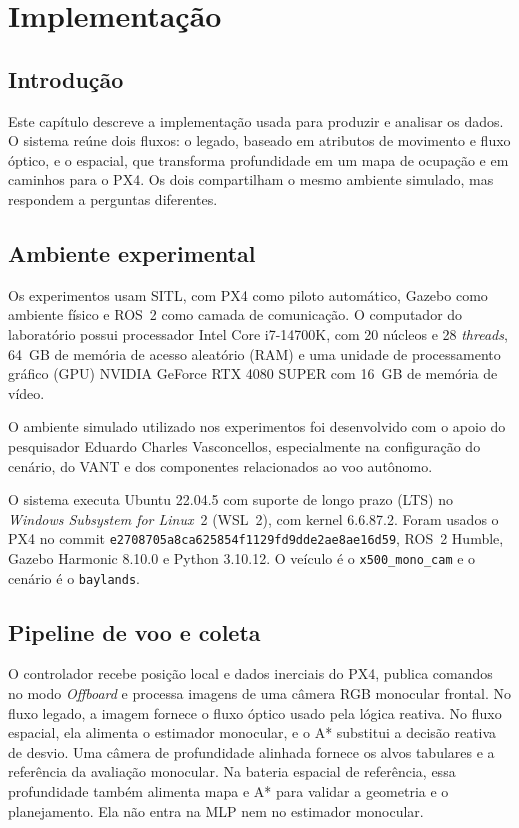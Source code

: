 \chapter{Implementação}\label{cap:implementacao}

\section{Introdução}

Este capítulo descreve a implementação usada para produzir e analisar os dados. O sistema reúne dois fluxos: o legado, baseado em atributos de movimento e fluxo óptico, e o espacial, que transforma profundidade em um mapa de ocupação e em caminhos para o PX4. Os dois compartilham o mesmo ambiente simulado, mas respondem a perguntas diferentes.

\section{Ambiente experimental}

Os experimentos usam SITL, com PX4 como piloto automático, Gazebo como ambiente físico e ROS~2 como camada de comunicação. O computador do laboratório possui processador Intel Core i7-14700K, com 20 núcleos e 28 \textit{threads}, 64~GB de memória de acesso aleatório (RAM) e uma unidade de processamento gráfico (GPU) NVIDIA GeForce RTX 4080 SUPER com 16~GB de memória de vídeo.

O ambiente simulado utilizado nos experimentos foi desenvolvido com o apoio do pesquisador Eduardo Charles Vasconcellos, especialmente na configuração do cenário, do VANT e dos componentes relacionados ao voo autônomo.

O sistema executa Ubuntu 22.04.5 com suporte de longo prazo (LTS) no \textit{Windows Subsystem for Linux}~2 (WSL~2), com kernel 6.6.87.2. Foram usados o PX4 no commit \texttt{e2708705a8ca625854f1129fd9dde2ae8ae16d59}, ROS~2 Humble, Gazebo Harmonic 8.10.0 e Python 3.10.12. O veículo é o \texttt{x500\_mono\_cam} e o cenário é o \texttt{baylands}.

\section{Pipeline de voo e coleta}

O controlador recebe posição local e dados inerciais do PX4, publica comandos no modo \textit{Offboard} e processa imagens de uma câmera RGB monocular frontal. No fluxo legado, a imagem fornece o fluxo óptico usado pela lógica reativa. No fluxo espacial, ela alimenta o estimador monocular, e o A* substitui a decisão reativa de desvio. Uma câmera de profundidade alinhada fornece os alvos tabulares e a referência da avaliação monocular. Na bateria espacial de referência, essa profundidade também alimenta mapa e A* para validar a geometria e o planejamento. Ela não entra na MLP nem no estimador monocular.

